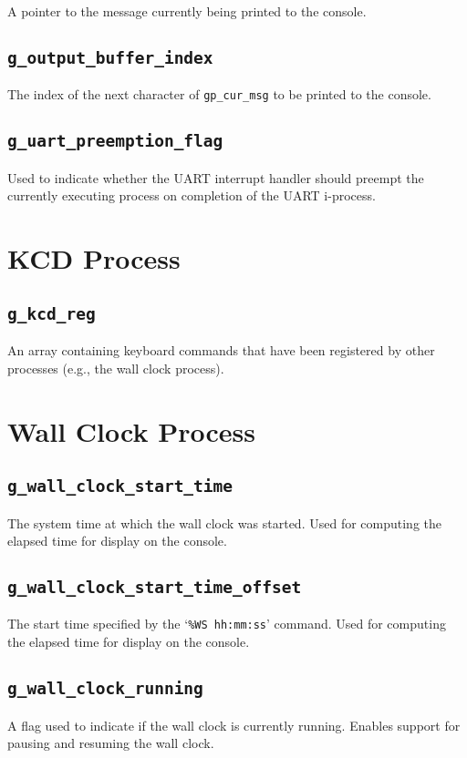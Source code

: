 \documentclass[12pt]{report}
\begin{document}
A pointer to the message currently being printed to the console.

\subsection{\texttt{g_output_buffer_index}}

The index of the next character of \texttt{gp_cur_msg} to be printed to the console.

\subsection{\texttt{g_uart_preemption_flag}}

Used to indicate whether the UART interrupt handler should preempt the currently executing process on completion of the UART i-process.

\section{KCD Process}

\subsection{\texttt{g_kcd_reg}}

An array containing keyboard commands that have been registered by other processes (e.g., the wall clock process).

\section{Wall Clock Process}

\subsection{\texttt{g_wall_clock_start_time}}

The system time at which the wall clock was started. Used for computing the elapsed time for display on the console.

\subsection{\texttt{g_wall_clock_start_time_offset}}

The start time specified by the `\texttt{\%WS hh:mm:ss}' command. Used for computing the elapsed time for display on the console.

\subsection{\texttt{g_wall_clock_running}}

A flag used to indicate if the wall clock is currently running. Enables support for pausing and resuming the wall clock.
\end{document}
